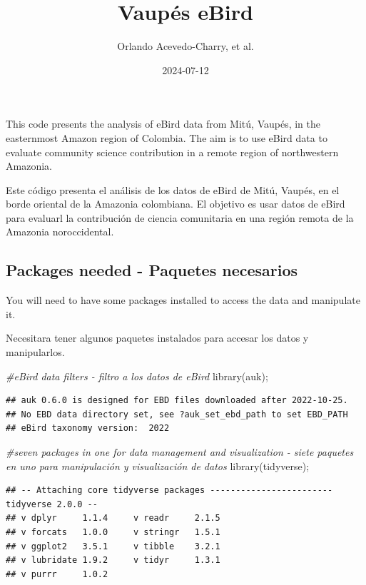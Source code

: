 \documentclass[
]{article}
\title{Vaupés eBird}
\author{Orlando Acevedo-Charry, et al.}
\date{2024-07-12}
\newenvironment{Shaded}{\begin{snugshade}}{\end{snugshade}}
\newcommand{\CommentTok}[1]{\textcolor[rgb]{0.56,0.35,0.01}{\textit{#1}}}
\newcommand{\FunctionTok}[1]{\textcolor[rgb]{0.00,0.00,0.00}{#1}}
\newcommand{\NormalTok}[1]{#1}
\begin{document}
\maketitle

This code presents the analysis of eBird data from Mitú, Vaupés, in the
easternmost Amazon region of Colombia. The aim is to use eBird data to
evaluate community science contribution in a remote region of
northwestern Amazonia.

Este código presenta el análisis de los datos de eBird de Mitú, Vaupés,
en el borde oriental de la Amazonia colombiana. El objetivo es usar
datos de eBird para evaluarl la contribución de ciencia comunitaria en
una región remota de la Amazonia noroccidental.

\hypertarget{packages-needed---paquetes-necesarios}{%
\subsection{Packages needed - Paquetes
necesarios}\label{packages-needed---paquetes-necesarios}}

You will need to have some packages installed to access the data and
manipulate it.

Necesitara tener algunos paquetes instalados para accesar los datos y
manipularlos.

\begin{Shaded}
\begin{Highlighting}[]
\CommentTok{\#eBird data filters {-} filtro a los datos de eBird}
\FunctionTok{library}\NormalTok{(auk); }
\end{Highlighting}
\end{Shaded}

\begin{verbatim}
## auk 0.6.0 is designed for EBD files downloaded after 2022-10-25. 
## No EBD data directory set, see ?auk_set_ebd_path to set EBD_PATH 
## eBird taxonomy version:  2022
\end{verbatim}

\begin{Shaded}
\begin{Highlighting}[]
\CommentTok{\#seven packages in one for data management and visualization {-} siete paquetes en uno para manipulación y visualización de datos}
\FunctionTok{library}\NormalTok{(tidyverse);}
\end{Highlighting}
\end{Shaded}

\begin{verbatim}
## -- Attaching core tidyverse packages ------------------------ tidyverse 2.0.0 --
## v dplyr     1.1.4     v readr     2.1.5
## v forcats   1.0.0     v stringr   1.5.1
## v ggplot2   3.5.1     v tibble    3.2.1
## v lubridate 1.9.2     v tidyr     1.3.1
## v purrr     1.0.2
\end{verbatim}
\end{document}
